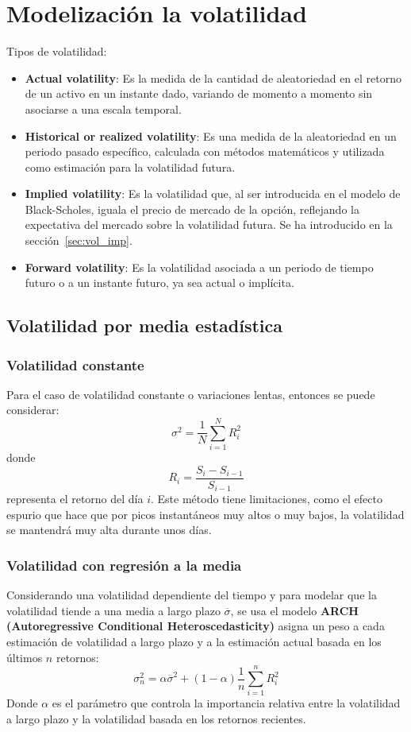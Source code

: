 \section{Modelización la volatilidad}
Tipos de volatilidad:
\begin{itemize}
    \item \textbf{Actual volatility}: Es la medida de la cantidad de aleatoriedad en el retorno de un activo en un instante dado, variando de momento a momento sin asociarse a una escala temporal.
    \item \textbf{Historical or realized volatility}: Es una medida de la aleatoriedad en un periodo pasado específico, calculada con métodos matemáticos y utilizada como estimación para la volatilidad futura.
    \item \textbf{Implied volatility}: Es la volatilidad que, al ser introducida en el modelo de Black-Scholes, iguala el precio de mercado de la opción, reflejando la expectativa del mercado sobre la volatilidad futura. Se ha introducido en la sección~\ref{sec:vol_imp}.
    \item \textbf{Forward volatility}: Es la volatilidad asociada a un periodo de tiempo futuro o a un instante futuro, ya sea actual o implícita.
\end{itemize}



\subsection{Volatilidad por media estadística}

\subsubsection{Volatilidad constante}
Para el caso de volatilidad constante o variaciones lentas, entonces se puede considerar:
\[
\boxed{\sigma^2 = \frac{1}{N} \sum_{i=1}^{N} R_i^2}
\]
donde 
\[
R_i = \frac{S_i - S_{i-1}}{S_{i-1}}
\]
representa el retorno del día $i$. Este método tiene limitaciones, como el efecto espurio que hace que por picos instantáneos muy altos o muy bajos, la volatilidad se mantendrá muy alta durante unos días.


\subsubsection{Volatilidad con regresión a la media}
Considerando una volatilidad dependiente del tiempo y para modelar que la volatilidad tiende a una media a largo plazo $\overline{\sigma}$, se usa el modelo \textbf{ARCH (Autoregressive Conditional Heteroscedasticity)} asigna un peso a cada estimación de volatilidad a largo plazo y a la estimación actual basada en los últimos $n$ retornos:
\[
\boxed{\sigma_n^2 = \alpha \overline{\sigma}^2 + (1 - \alpha) \frac{1}{n} \sum_{i=1}^{n} R_i^2}
\]
Donde $\alpha$ es el parámetro que controla la importancia relativa entre la volatilidad a largo plazo y la volatilidad basada en los retornos recientes.



